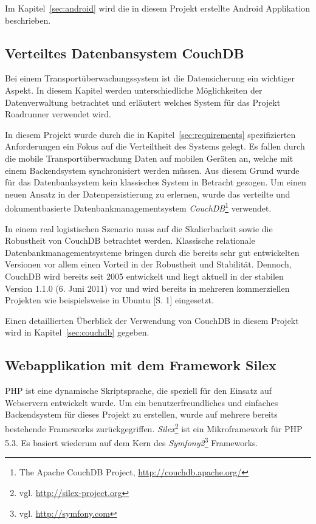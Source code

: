 Im Kapitel~\ref{sec:android} wird die in diesem Projekt erstellte Android Applikation
	beschrieben.

\subsection{Verteiltes Datenbansystem CouchDB}
\label{subsec:couchdb}

Bei einem Transportüberwachungssystem ist die Datensicherung ein
	wichtiger Aspekt. In diesem Kapitel werden unterschiedliche 
	Möglichkeiten der Datenverwaltung betrachtet und erläutert welches
	System für das Projekt Roadrunner verwendet wird.

In diesem Projekt wurde durch die in Kapitel~\ref{sec:requirements} spezifizierten
	Anforderungen ein Fokus auf die Verteiltheit des Systems gelegt. Es fallen
	durch die mobile Transportüberwachung Daten auf mobilen Geräten an, welche
	mit einem Backendsystem synchronisiert werden müssen. Aus diesem Grund wurde
	für das Datenbanksystem kein klassisches System in Betracht gezogen. Um einen
	neuen Ansatz in der Datenpersistierung zu erlernen, wurde das verteilte
	und dokumentbasierte Datenbankmanagementsystem \emph{CouchDB}\footnote{The
	Apache CouchDB Project, \url{http://couchdb.apache.org/}} verwendet.

In einem real logistischen Szenario muss auf die Skalierbarkeit sowie die
	Robustheit von CouchDB betrachtet werden. Klassische relationale
	Datenbankmanagementsysteme bringen durch die bereits sehr gut entwickelten
	Versionen vor allem einen Vorteil in der Robustheit und Stabilität. Dennoch,
	CouchDB wird bereits seit 2005 entwickelt und liegt aktuell in der stabilen
	Version 1.1.0 (6. Juni 2011) vor und wird bereits in mehreren kommerziellen
	Projekten wie beispielsweise in Ubuntu \cite{Murphy09}[S. 1] eingesetzt.

Einen detaillierten Überblick der Verwendung von CouchDB in diesem Projekt
	wird in Kapitel~\ref{sec:couchdb} gegeben.

\subsection{Webapplikation mit dem Framework Silex}
\label{subsec:webapplication}

PHP ist eine dynamische Skriptsprache, die speziell für den Einsatz auf Webservern
	entwickelt wurde. Um ein benutzerfreundliches und einfaches Backendsystem
	für dieses Projekt zu erstellen, wurde auf mehrere bereits bestehende Frameworks
	zurückgegriffen. \emph{Silex}\footnote{vgl. \url{http://silex-project.org}} ist
	ein	Mikroframework für PHP 5.3. Es basiert wiederum auf dem Kern des
	\emph{Symfony2}\footnote{vgl. \url{http://symfony.com}} Frameworks.
	
